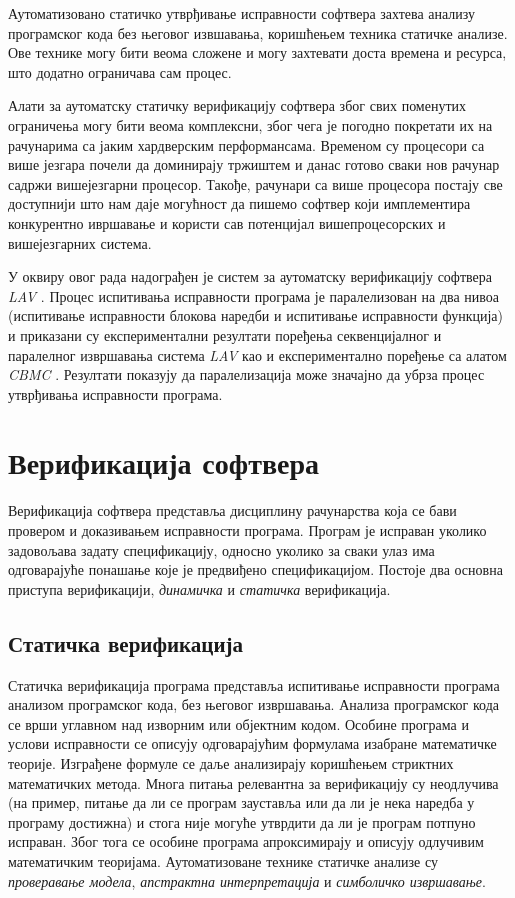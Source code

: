 \documentclass[12pt,oneside]{memoir}
\begin{document}
 Аутоматизовано статичко утврђивање исправности софтвера захтева анализу програмског кода без његовог извшавања, коришћењем техника статичке анализе. Ове технике могу бити веома сложене и могу захтевати доста времена и ресурса, што додатно ограничава сам процес.

 Алати за аутоматску статичку верификацију софтвера због свих поменутих ограничења могу бити веома комплексни, због чега је погодно покретати их на рачунарима са јаким хардверским перформансама. Временом су процесори са више језгара почели да доминирају тржиштем и данас готово сваки нов рачунар садржи вишејезгарни процесор. Такође, рачунари са више процесора постају све доступнији што нам даје могућност да пишемо софтвер који имплементира конкурентно ивршавање и користи сав потенцијал вишепроцесорских и вишејезгарних система.
 
 У оквиру овог рада надограђен је систем за аутоматску верификацију софтвера \textit{LAV} \cite{mvjphd}. Процес испитивања исправности програма је паралелизован на два нивоа (испитивање исправности блокова наредби и испитивање исправности функција) и приказани су експериментални резултати поређења секвенцијалног и паралелног извршавања система \textit{LAV} као и експериментално поређење са алатом \textit{CBMC} \cite{cbmc}. Резултати показују да паралелизација може значајно да убрза процес утврђивања исправности програма.



\chapter{Верификација софтвера}
	Верификација софтвера представља дисциплину рачунарства која се бави провером и доказивањем исправности програма. Програм је исправан уколико задовољава задату спецификацију, односно уколико за сваки улаз има одговарајуће понашање које је предвиђено спецификацијом. Постоје два основна приступа верификацији, \textit{динамичка} и \textit{статичка} верификација.
  
  
  \section{Статичка верификација}
  \label{statver}
  Статичка верификација програма представља испитивање исправности програма анализом програмског кода, без његовог извршавања. Анализа програмског кода се врши углавном над изворним или објектним кодом. Особине програма и услови исправности се описују одговарајућим формулама изабране математичке теорије. Изграђене формуле се даље анализирају коришћењем стриктних математичких метода. Многа питања релевантна за верификацију су неодлучива (на пример, питање да ли се програм зауставља или да ли је нека наредба у програму достижна) и стога није могуће утврдити да ли је програм потпуно исправан. Због тога се особине програма апроксимирају и описују одлучивим математичким теоријама. Аутоматизоване технике статичке анализе су \textit{проверавање модела}, \textit{апстрактна интерпретација} и \textit{симболичко извршавање}.  
  
\end{document}
